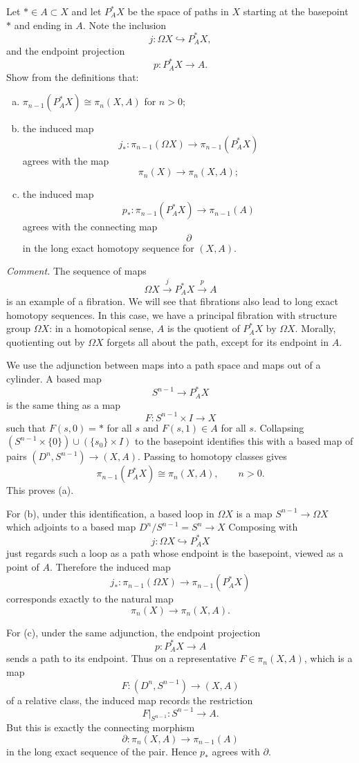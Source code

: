 \documentclass[12pt]{article}
\begin{document}
\begin{problem}[4]
Let $* \in A \subset X$ and let $P^*_A X$ be the space of paths in $X$ starting at the basepoint $*$ and ending in $A$. Note the inclusion
\[
j\colon \Omega X \hookrightarrow P^*_A X,
\]
and the endpoint projection
\[
p\colon P^*_A X \to A.
\]
Show from the definitions that:
\begin{enumerate}[(a)]
    \item $\pi_{n-1}(P^*_A X)\cong \pi_n(X,A)$ for $n>0$;
    \item the induced map
    \[
    j_* \colon \pi_{n-1}(\Omega X)\to \pi_{n-1}(P^*_A X)
    \]
    agrees with the map
    \[
    \pi_n(X)\to \pi_n(X,A);
    \]
    \item the induced map
    \[
    p_* \colon \pi_{n-1}(P^*_A X)\to \pi_{n-1}(A)
    \]
    agrees with the connecting map
    \[
    \partial
    \]
    in the long exact homotopy sequence for $(X,A)$.
\end{enumerate}

\medskip

\noindent\textit{Comment.}
The sequence of maps
\[
\Omega X \xrightarrow{\,j\,} P^*_A X \xrightarrow{\,p\,} A
\]
is an example of a fibration. We will see that fibrations also lead to long exact homotopy sequences. In this case, we have a principal fibration with structure group $\Omega X$: in a homotopical sense, $A$ is the quotient of $P^*_A X$ by $\Omega X$. Morally, quotienting out by $\Omega X$ forgets all about the path, except for its endpoint in $A$.
\end{problem}

\begin{solution}
We use the adjunction between maps into a path space and maps out of a cylinder.
A based map
\[
S^{n-1}\to P_A^*X
\]
is the same thing as a map
\[
F\colon S^{n-1}\times I\to X
\]
such that $F(s,0)=*$ for all $s$ and $F(s,1)\in A$ for all $s$. Collapsing $(S^{n-1}\times \{0\})\cup (\{s_0\}\times I)$
to the basepoint identifies this with a based map of pairs
$(D^n,S^{n-1})\to (X,A)$.
Passing to homotopy classes gives
\[
\pi_{n-1}(P_A^*X)\cong \pi_n(X,A),
\qquad n>0.
\]
This proves (a).

For (b), under this identification, a based loop in $\Omega X$ is a map
$S^{n-1}\to \Omega X$
which adjoints to a based map $D^n/S^{n-1}=S^n\to X$
Composing with
\[
j\colon \Omega X\hookrightarrow P_A^*X
\]
just regards such a loop as a path whose endpoint is the basepoint, viewed as a point of $A$. Therefore the induced map
\[
j_*\colon \pi_{n-1}(\Omega X)\to \pi_{n-1}(P_A^*X)
\]
corresponds exactly to the natural map
\[
\pi_n(X)\to \pi_n(X,A).
\]

For (c), under the same adjunction, the endpoint projection
\[
p\colon P_A^*X\to A
\]
sends a path to its endpoint. Thus on a representative $F\in \pi_n(X,A)$, which is a map
\[
F\colon (D^n,S^{n-1})\to (X,A)
\]
of a relative class, the induced map records the restriction
\[
F|_{S^{n-1}}\colon S^{n-1}\to A.
\]
But this is exactly the connecting morphism
\[
\partial\colon \pi_n(X,A)\to \pi_{n-1}(A)
\]
in the long exact sequence of the pair. Hence $p_*$ agrees with $\partial$.
\end{solution}
\end{document}
